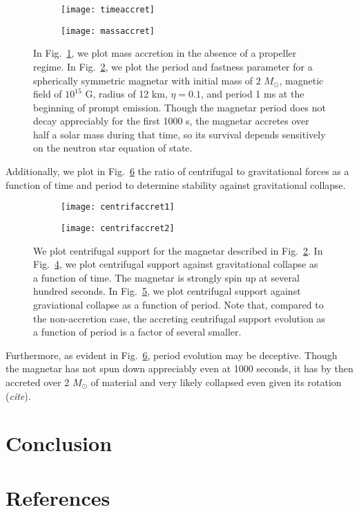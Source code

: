 \documentclass{article}
\begin{document}
\begin{figure}[h!]
\centering
\begin{subfigure}{.5\textwidth}
    \centering
    \texttt{[image: timeaccret]}
    \caption{}
    \label{fig:5a}
\end{subfigure}%
\begin{subfigure}{.5\textwidth}
    \centering
    \texttt{[image: massaccret]}
    \caption{}
    \label{fig:5b}
\end{subfigure}
\caption{In Fig.~\ref{fig:5a}, we plot mass accretion in the absence of a propeller regime. In Fig.~\ref{fig:5b}, we plot the period and fastness parameter for a spherically symmetric  magnetar with initial mass of 2 $M_{\odot}$, magnetic field of $10^{15}$ G, radius of 12 km, $\eta=0.1$,  and period 1 ms at the beginning of prompt emission. Though the magnetar period does not decay appreciably for the first 1000 s, the magnetar accretes over half a solar mass during that time, so its survival depends sensitively on the neutron star equation of state.}
\label{}
\end{figure}

Additionally, we plot in Fig.~\ref{fig:6} the ratio of centrifugal to gravitational forces as a function of time and period to determine stability against gravitational collapse.

\begin{figure}[h!]
\centering
\begin{subfigure}{.5\textwidth}
    \centering
    \texttt{[image: centrifaccret1]}
    \caption{}
    \label{fig:6a}
\end{subfigure}%
\begin{subfigure}{.5\textwidth}
    \centering
    \texttt{[image: centrifaccret2]}
    \caption{}
    \label{fig:6b}
\end{subfigure}
\caption{We plot centrifugal support for the magnetar described in Fig.~\ref{fig:5b}. In Fig.~\ref{fig:6a}, we plot centrifugal support against gravitational collapse as a function of time. The magnetar is strongly spin up at several hundred seconds. In Fig.~\ref{fig:6b}, we plot centrifugal support against graviational collapse as a function of period. Note that, compared to the non-accretion case, the accreting centrifugal support evolution as a function of period is a factor of several smaller.}
\label{fig:6}
\end{figure}

Furthermore, as evident in Fig.~\ref{fig:6}, period evolution may be deceptive. Though the magnetar has not spun down appreciably even at 1000 seconds, it has by then accreted over 2 $M_{\odot}$ of material and very likely collapsed even given its rotation (\textit{cite}).

\section{Conclusion}

\newpage
\clearpage
\renewcommand*{\refname}{}
\section{References}


\end{document}
